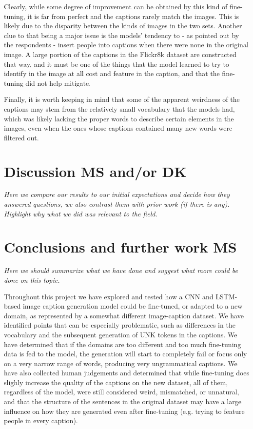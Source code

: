 \documentclass[11pt]{article}
\begin{document}
Clearly, while some degree of improvement can be obtained by this kind of fine-tuning, it is far from perfect and the captions rarely match the images. This is likely due to the disparity between the kinds of images in the two sets. Another clue to that being a major issue is the models' tendency to - as pointed out by the respondents - insert people into captions when there were none in the original image. A large portion of the captions in the Flickr8k dataset are constructed that way, and it must be one of the things that the model learned to try to identify in the image at all cost and feature in the caption, and that the fine-tuning did not help mitigate.

Finally, it is worth keeping in mind that some of the apparent weirdness of the captions may stem from the relatively small vocabulary that the models had, which was likely lacking the proper words to describe certain elements in the images, even when the ones whose captions contained many new words were filtered out. 

\section{Discussion \textbf{MS and/or DK}}

\textit{Here we compare our results to our initial expectations and decide how they answered questions, we also contrast them with prior work (if there is any). Highlight why what we did was relevant to the field.}

\section{Conclusions and further work \textbf{MS}}

\textit{Here we should summarize what we have done and suggest what more could be done on this topic.}

Throughout this project we have explored and tested how a CNN and LSTM-based image caption generation model could be fine-tuned, or adapted to a new domain, as represented by a somewhat different image-caption dataset. We have identified points that can be especially problematic, such as differences in the vocabulary and the subsequent generation of UNK tokens in the captions. We have determined that if the domains are too different and too much fine-tuning data is fed to the model, the generation will start to completely fail or focus only on a very narrow range of words, producing very ungrammatical captions. We have also collected human judgements and determined that while fine-tuning does slighly increase the quality of the captions on the new dataset, all of them, regardless of the model, were still considered weird, mismatched, or unnatural, and that the structure of the sentences in the original dataset may have a large influence on how they are generated even after fine-tuning (e.g. trying to feature people in every caption). 
\end{document}
